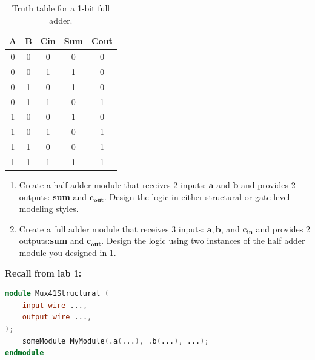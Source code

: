 \documentclass[12pt]{betterjournal}
\begin{document}
\begin{table}[H]
    \centering
    \begin{tabular}{ccc|cc}
        \toprule
        A & B & Cin & Sum & Cout \\
        \midrule
        0 & 0 & 0 & 0 & 0 \\
        0 & 0 & 1 & 1 & 0 \\
        0 & 1 & 0 & 1 & 0 \\
        0 & 1 & 1 & 0 & 1 \\
        1 & 0 & 0 & 1 & 0 \\
        1 & 0 & 1 & 0 & 1 \\
        1 & 1 & 0 & 0 & 1 \\
        1 & 1 & 1 & 1 & 1 \\
        \bottomrule
    \end{tabular}
    \caption{Truth table for a 1-bit full adder.}
    \label{tab:full_adder_tt}
\end{table}
\clearpage
\begin{question}
\begin{enumerate}
    \item  Create a half adder module that receives 2 inputs: $\mathbf{a}$ and $\mathbf{b}$ and provides 2 outputs: \textbf{sum} and $\textbf{c}_\textbf{out}$. Design the logic in either structural or gate-level modeling styles.
    \item Create a full adder module that receives 3 inputs: $\mathbf{a},\mathbf{b}$, and $\textbf{c}_\textbf{in}$ and provides 2 outputs:\hspace{1em}\textbf{sum} and $\textbf{c}_\textbf{out}$. Design the logic using two instances of the half adder module you designed in 1.
\end{enumerate}
\end{question}
\noindent
\textbf{Recall from lab 1:}
\begin{lstlisting}[language=Verilog]
module Mux41Structural (
    input wire ...,
    output wire ..., 
);
    someModule MyModule(.a(...), .b(...), ...);
endmodule
\end{lstlisting}
\end{document}
